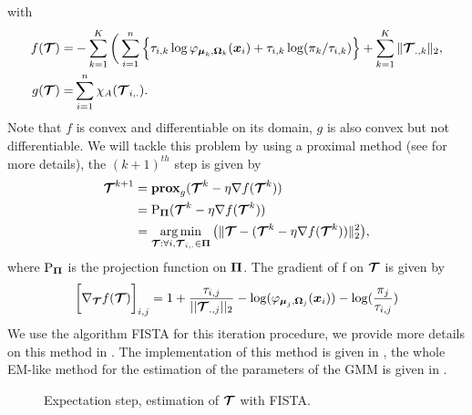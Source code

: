 with
\begin{align*}
f(\boldsymbol{\mathcal T}) =& -\sum_{k=1}^K \bigg(\sum_{i=1}^{n} \Big\{\tau_{i,k}\log\varphi_{\boldsymbol\mu_{k},\boldsymbol\Omega_{k}}(\boldsymbol x_i)+\tau_{i,k} \log(\pi_k/\tau_{i,k})\Big\} + \sum_{k=1}^K \|\boldsymbol{\mathcal T}_{.,k}\|_{2},\\
g(\boldsymbol{\mathcal T}) =& \sum_{i=1}^{n} \chi_A(\boldsymbol{\mathcal T}_{i,.}).
\end{align*}
Note that $f$ is convex and differentiable on its domain, $g$ is also convex but not differentiable. We will tackle this problem by using a proximal method (see \citep{Parikh:2014:PA:2693612.2693613} for more details), the $(k+1)^{th}$ step is given by
\begin{align*}
  \boldsymbol{\mathcal T}^{k+1} &= {\bf{prox}}_{g}(\boldsymbol{\mathcal T}^k - \eta \nabla f(\boldsymbol{\mathcal T}^k))\\
      &= \textnormal{P}_{\boldsymbol\Pi}(\boldsymbol{\mathcal T}^k - \eta \nabla f(\boldsymbol{\mathcal T}^k))\\
      &=\operatorname*{arg\,min}_{ \boldsymbol{\mathcal T} : \forall i, \boldsymbol{\mathcal T}_{i,.} \in \boldsymbol\Pi}\big( \| \boldsymbol{\mathcal T} - (\boldsymbol{\mathcal T}^k - \eta \nabla f(\boldsymbol{\mathcal T}^k) ) \|^2_2 \big),
\end{align*}
where $\textnormal{P}_{\boldsymbol\Pi}$ is the projection function on $\boldsymbol\Pi$. The gradient of f on $\boldsymbol{\mathcal T}$ is given by
\begin{equation}
\bigg[\nabla_{\boldsymbol{\mathcal T}}f(\boldsymbol{\mathcal T})\bigg]_{i,j} = 
1+\frac{\tau_{i,j}}{||\boldsymbol{\mathcal T}_{.,j}||_2}-\log(\varphi_{\boldsymbol\mu_j,\boldsymbol\Omega_j}(\boldsymbol x_i))-\log(\frac{\pi_j}{\tau_{i,j}})
\end{equation}
We use the algorithm FISTA \citep{Beck:2009:FIS:1658360.1658364} for this iteration procedure, we provide more details on this method in . The implementation of this method is given in , the whole EM-like method for the estimation of the parameters of the GMM is given in . 
\begin{figure}
\begin{center}
   \caption{Expectation step, estimation of $\boldsymbol{\mathcal T}$ with FISTA.}
   \label{algo:Pen_tau_EM_expect}
\end{center}
\end{figure}

